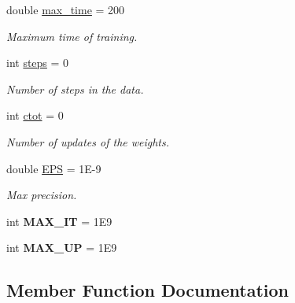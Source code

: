 \begin{DoxyCompactItemize}
double \hyperlink{class_classifier_ae5ada7ce4d5436d1dcff3dff458107fd}{max\+\_\+time} = 200
\begin{DoxyCompactList}\small\item\em Maximum time of training. \end{DoxyCompactList}\item 
\mbox{\label{class_classifier_a1e4c9c9ba059d5aff1d4d81eb41725cb}} 
int \hyperlink{class_classifier_a1e4c9c9ba059d5aff1d4d81eb41725cb}{steps} = 0
\begin{DoxyCompactList}\small\item\em Number of steps in the data. \end{DoxyCompactList}\item 
\mbox{\label{class_classifier_a99d9a7f504212bb3dc2726c10a2333c6}} 
int \hyperlink{class_classifier_a99d9a7f504212bb3dc2726c10a2333c6}{ctot} = 0
\begin{DoxyCompactList}\small\item\em Number of updates of the weights. \end{DoxyCompactList}\item 
\mbox{\label{class_classifier_ad7cd0cfea68461340df2adb0c132dc93}} 
double \hyperlink{class_classifier_ad7cd0cfea68461340df2adb0c132dc93}{E\+PS} = 1\+E-\/9
\begin{DoxyCompactList}\small\item\em Max precision. \end{DoxyCompactList}\item 
\mbox{\label{class_classifier_a9cab88ab4489d771256bffb1717c1644}} 
int {\bfseries M\+A\+X\+\_\+\+IT} = 1\+E9
\item 
\mbox{\label{class_classifier_abb8b95854801151e78a1d9f6a2173c22}} 
int {\bfseries M\+A\+X\+\_\+\+UP} = 1\+E9
\end{DoxyCompactItemize}


\subsection{Member Function Documentation}
\mbox{\label{class_classifier_ae8e9554823b85ddc2dcad2955da811d9}} 
